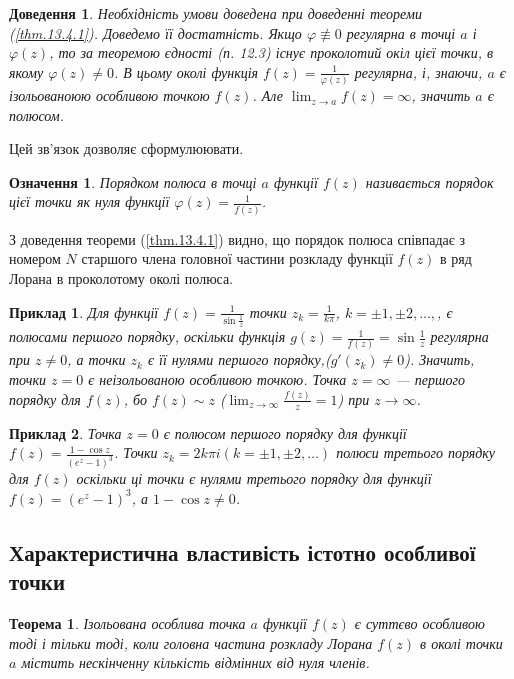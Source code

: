 \documentclass[12pt,fleqn]{article}
\newtheorem{exm}{Приклад}[section]
\theoremstyle{theorem}
\newtheorem{thm}{Теорема}[section]
\newtheorem{ozn}{Означення}[section]
\theoremstyle{proof}
\newtheorem*{dov}{Доведення}
\numberwithin{figure}{section}
\numberwithin{equation}{section}
\begin{document}
\begin{dov}
Необхідність умови доведена при доведенні теореми (\ref{thm.13.4.1}). Доведемо її достатність. Якщо $\varphi \not\equiv 0$ регулярна в точці $a$ і $\varphi(z)$, то за теоремою єдності (п. 12.3) існує проколотий окіл цієї точки, в якому $\varphi(z)\neq 0$. В цьому околі функція $f(z)=\frac{1}{\varphi(z)}$ регулярна, і, знаючи, $a$ є ізольованоюю особливою точкою $f(z)$. Але $\lim_{z \to a}f(z)=\infty$, значить $a$ є полюсом.
\end{dov}
Цей зв'язок дозволяє сформулюювати.

\begin{ozn}
  Порядком полюса в точці $a$ функції $f(z)$ називається порядок цієї точки як нуля функції $\varphi(z)=\frac{1}{f(z)}$.
\end{ozn}

З доведення теореми (\ref{thm.13.4.1}) видно, що порядок полюса співпадає з номером $N$ старшого члена головної частини розкладу функції $f(z)$ в ряд Лорана в проколотому околі полюса.

\begin{exm}
Для функції $f(z)=\frac{1}{\sin\frac{1}{z}}$ точки $z_k=\frac{1}{k\pi}$, $k=\pm 1, \pm 2, \dots,$, є полюсами першого порядку, оскільки функція $g(z)=\frac{1}{f(z)}=\sin\frac{1}{z}$ регулярна при $z\neq 0$, а точки $z_k$ є її нулями першого порядку,($g'(z_k)\neq 0$). Значить, точки $z=0$ є неізольованою особливою точкою. Точка $z=\infty$ --- першого порядку для $f(z)$, бо $f(z)\sim z$ ($\lim_{z \to \infty}\frac{f(z)}{z}=1$) при $z \to \infty$.
\end{exm}

\begin{exm}
Точка $z=0$ є полюсом першого порядку для функції $f(z)=\frac{1-\cos z}{(e^z-1)^3}$. Точки $z_k=2k\pi i (k=\pm 1, \pm 2,\dots)$ полюси третього порядку для $f(z)$ оскільки ці точки є нулями третього порядку для функції $f(z)=(e^z-1)^3$, а $1-\cos z \neq 0$.
\end{exm}

\subsection{Характеристична властивість істотно особливої точки}\label{13.5}

\begin{thm}\label{thm.13.5.1}
  Ізольована особлива точка $a$ функції $f(z)$ є суттєво особливою тоді і тільки тоді, коли головна частина розкладу Лорана $f(z)$ в околі точки $a$ містить нескінченну кількість відмінних від нуля членів.
\end{thm}
\end{document}

